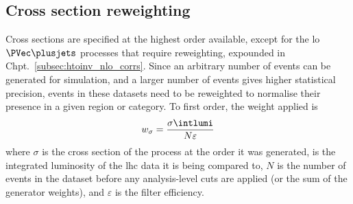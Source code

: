 

\subsection{Cross section reweighting}
\label{subsec:xs_weighting}

Cross sections are specified at the highest order available, except for the \acrshort{lo} $\PVec \plusjets$ processes that require reweighting, expounded in Chpt.~\ref{subsec:htoinv_nlo_corrs}. Since an arbitrary number of events can be generated for simulation, and a larger number of events gives higher statistical precision, events in these datasets need to be reweighted to normalise their presence in a given region or category. To first order, the weight applied is
\begin{equation}
    w_{\sigma} = \frac{ \sigma \intlumi }{ N \varepsilon }
    \label{eq:xs_weight}
\end{equation}
where $\sigma$ is the cross section of the process at the order it was generated, \intlumi is the integrated luminosity of the \acrshort{lhc} data it is being compared to, $N$ is the number of events in the dataset before any analysis-level cuts are applied (or the sum of the generator weights), and $\varepsilon$ is the filter efficiency.


